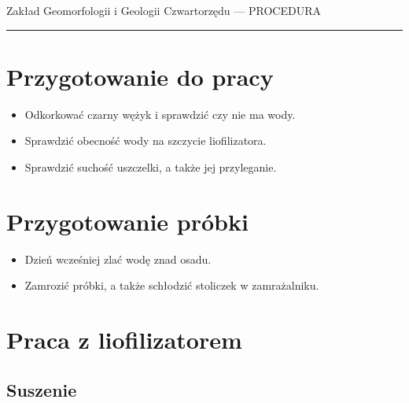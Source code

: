 \documentclass[
  letterpaper,
  DIV=11,
  numbers=noendperiod]{scrreprt}
\begin{document}
Zakład Geomorfologii i Geologii Czwartorzędu --- PROCEDURA

\begin{center}\rule{0.5\linewidth}{0.5pt}\end{center}

\hypertarget{przygotowanie-do-pracy-4}{%
\section{Przygotowanie do pracy}\label{przygotowanie-do-pracy-4}}

\begin{itemize}
\item
  Odkorkować czarny wężyk i sprawdzić czy nie ma wody.
\item
  Sprawdzić obecność wody na szczycie liofilizatora.
\item
  Sprawdzić suchość uszczelki, a także jej przyleganie.
\end{itemize}

\hypertarget{przygotowanie-pruxf3bki-1}{%
\section{Przygotowanie próbki}\label{przygotowanie-pruxf3bki-1}}

\begin{itemize}
\item
  Dzień wcześniej zlać wodę znad osadu.
\item
  Zamrozić próbki, a także schłodzić stoliczek w zamrażalniku.
\end{itemize}

\hypertarget{praca-z-liofilizatorem}{%
\section{Praca z liofilizatorem}\label{praca-z-liofilizatorem}}

\hypertarget{suszenie}{%
\subsection{Suszenie}\label{suszenie}}
\end{document}
